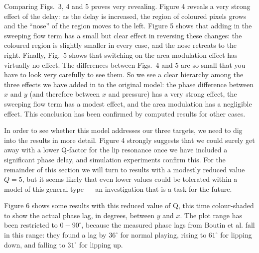 

  Comparing Figs.\ 3, 4 and 5 proves very revealing. Figure 4 reveals a very 
  strong effect of the delay: as the delay is increased, the region of coloured 
  pixels grows and the ``nose'' of the region moves to the left. Figure 5 shows 
  that adding in the sweeping flow term has a small but clear effect in 
  reversing these changes: the coloured region is slightly smaller in every 
  case, and the nose retreats to the right. Finally, Fig.\ 5 shows that 
  switching on the area modulation effect has virtually no effect. The 
  differences between Figs.\ 4 and 5 are so small that you have to look very 
  carefully to see them. So we see a clear hierarchy among the three effects we 
  have added in to the original model: the phase difference between $x$ and $y$ 
  (and therefore between $x$ and pressure) has a very strong effect, the 
  sweeping flow term has a modest effect, and the area modulation has a 
  negligible effect. This conclusion has been confirmed by computed results for 
  other cases. 

  In order to see whether this model addresses our three targets, we need to 
  dig into the results in more detail. Figure 4 strongly suggests that we could 
  surely get away with a lower Q-factor for the lip resonance once we have 
  included a significant phase delay, and simulation experiments confirm this. 
  For the remainder of this section we will turn to results with a modestly 
  reduced value $Q=5$, but it seems likely that even lower values could be 
  tolerated within a model of this general type --- an investigation that is a 
  task for the future. 

  Figure 6 shows some results with this reduced value of Q, this time 
  colour-shaded to show the actual phase lag, in degrees, between $y$ and $x$. 
  The plot range has been restricted to $0-90^\circ$, because the measured 
  phase lags from Boutin et al. fall in this range: they found a lag by 
  $36^\circ$ for normal playing, rising to $61^\circ$ for lipping down, and 
  falling to $31^\circ$ for lipping up. 

